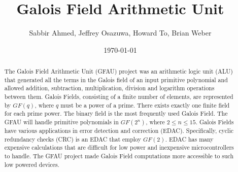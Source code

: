 \documentclass[12pt]{extarticle}
\title{Galois Field Arithmetic Unit}
\author{Sabbir Ahmed, Jeffrey Osazuwa, Howard To, Brian Weber}
\date{\today}
\begin{document}
    \maketitle

    \begin{abstract}

        \large
        The Galois Field Arithmetic Unit (GFAU) project was an arithmetic logic
        unit (ALU) that generated all the terms in the Galois field of an input
        primitive polynomial and allowed addition, subtraction, multiplication,
        division and logarithm operations between them. Galois Fields,
        consisting of a finite number of elements, are represented by $GF(q)$,
        where $q$ must be a power of a prime. There exists exactly one finite
        field for each prime power. The binary field is the most frequently
        used Galois Field. The GFAU will handle primitive polynomials in
        $GF(2^n)$, where $2 \le n \le 15$. Galois Fields have various
        applications in error detection and correction (EDAC). Specifically,
        cyclic redundancy checks (CRC) is an EDAC that employ $GF(2)$. EDAC has
        many expensive calculations that are difficult for low power and
        inexpensive microcontrollers to handle. The GFAU project made Galois
        Field computations more accessible to such low powered devices.

    \end{abstract}
\end{document}
